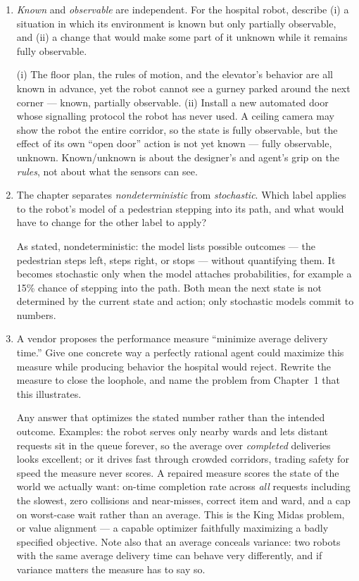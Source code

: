 \documentclass[11pt]{article}
\newif\ifsol
\newcommand{\ans}[1]{\ifsol\relax\else\vspace{#1}\filbreak\fi}
\newenvironment{solution}
  {\ifsol
     \par\vspace{4pt}\noindent
     \color{solgreen}\textbf{Solution.}\enspace\itshape\ignorespaces
   \else
     \setbox0\vbox\bgroup
   \fi}
  {\ifsol\par\normalcolor\upshape\vspace{4pt}\else\egroup\fi}
\begin{document}
\begin{enumerate}[label=(\alph*),leftmargin=*]
\item \emph{Known} and \emph{observable} are independent. For the hospital robot, describe
(i) a situation in which its environment is known but only partially observable, and
(ii) a change that would make some part of it unknown while it remains fully observable.
\ans{1.2in}
\begin{solution}
(i) The floor plan, the rules of motion, and the elevator's behavior are all known in
advance, yet the robot cannot see a gurney parked around the next corner --- known,
partially observable.
(ii) Install a new automated door whose signalling protocol the robot has never used. A
ceiling camera may show the robot the entire corridor, so the state is fully observable,
but the effect of its own ``open door'' action is not yet known --- fully observable,
unknown. Known/unknown is about the designer's and agent's grip on the \emph{rules}, not
about what the sensors can see.
\end{solution}

\item The chapter separates \emph{nondeterministic} from \emph{stochastic}. Which label
applies to the robot's model of a pedestrian stepping into its path, and what would have to
change for the other label to apply?
\ans{0.9in}
\begin{solution}
As stated, nondeterministic: the model lists possible outcomes --- the pedestrian steps
left, steps right, or stops --- without quantifying them. It becomes stochastic only when
the model attaches probabilities, for example a 15\% chance of stepping into the path. Both
mean the next state is not determined by the current state and action; only stochastic
models commit to numbers.
\end{solution}

\item A vendor proposes the performance measure ``minimize average delivery time.'' Give one
concrete way a perfectly rational agent could maximize this measure while producing
behavior the hospital would reject. Rewrite the measure to close the loophole, and name the
problem from Chapter~1 that this illustrates.
\ans{1.4in}
\begin{solution}
Any answer that optimizes the stated number rather than the intended outcome. Examples: the
robot serves only nearby wards and lets distant requests sit in the queue forever, so the
average over \emph{completed} deliveries looks excellent; or it drives fast through crowded
corridors, trading safety for speed the measure never scores. A repaired measure scores the
state of the world we actually want: on-time completion rate across \emph{all} requests
including the slowest, zero collisions and near-misses, correct item and ward, and a cap on
worst-case wait rather than an average. This is the King Midas problem, or value alignment
--- a capable optimizer faithfully maximizing a badly specified objective. Note also that
an average conceals variance: two robots with the same average delivery time can behave very
differently, and if variance matters the measure has to say so.
\end{solution}

\end{enumerate}
\end{document}
